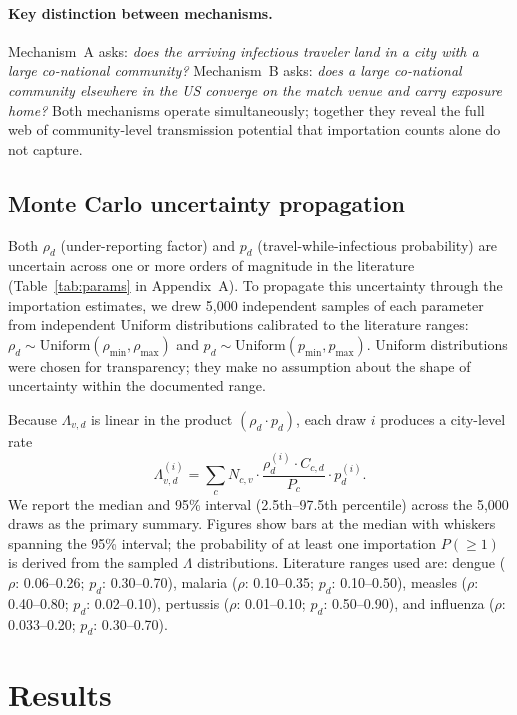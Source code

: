 \documentclass[12pt]{article}
\begin{document}
\paragraph{Key distinction between mechanisms.}
Mechanism~A asks: \emph{does the arriving infectious traveler land in a city
with a large co-national community?} Mechanism~B asks: \emph{does a large
co-national community elsewhere in the US converge on the match venue and
carry exposure home?} Both mechanisms operate simultaneously; together they
reveal the full web of community-level transmission potential that importation
counts alone do not capture.

\subsection*{Monte Carlo uncertainty propagation}

Both $\rho_d$ (under-reporting factor) and $p_d$ (travel-while-infectious probability) are uncertain across one or more orders of magnitude in the literature (Table~\ref{tab:params} in Appendix~A). To propagate this uncertainty through the importation estimates, we drew 5,000 independent samples of each parameter from independent Uniform distributions calibrated to the literature ranges: $\rho_d \sim \text{Uniform}(\rho_\text{min}, \rho_\text{max})$ and $p_d \sim \text{Uniform}(p_\text{min}, p_\text{max})$. Uniform distributions were chosen for transparency; they make no assumption about the shape of uncertainty within the documented range.

Because $\Lambda_{v,d}$ is linear in the product $(\rho_d \cdot p_d)$, each draw $i$ produces a city-level rate
\[
  \Lambda_{v,d}^{(i)} = \sum_c N_{c,v} \cdot \frac{\rho_d^{(i)} \cdot C_{c,d}}{P_c} \cdot p_d^{(i)}.
\]
We report the median and 95\% interval (2.5th--97.5th percentile) across the 5,000 draws as the primary summary. Figures show bars at the median with whiskers spanning the 95\% interval; the probability of at least one importation $P(\geq 1)$ is derived from the sampled $\Lambda$ distributions. Literature ranges used are: dengue ($\rho$: 0.06--0.26; $p_d$: 0.30--0.70), malaria ($\rho$: 0.10--0.35; $p_d$: 0.10--0.50), measles ($\rho$: 0.40--0.80; $p_d$: 0.02--0.10), pertussis ($\rho$: 0.01--0.10; $p_d$: 0.50--0.90), and influenza ($\rho$: 0.033--0.20; $p_d$: 0.30--0.70).

\section*{Results}
\end{document}
